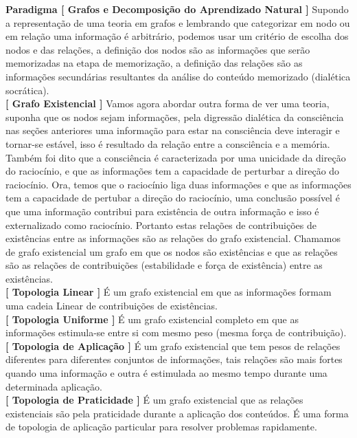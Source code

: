 \textbf{Paradigma [ Grafos e Decomposição do Aprendizado Natural ]} Supondo a representação de uma teoria em grafos e lembrando que categorizar em nodo ou em relação uma informação é arbitrário, podemos usar um critério de escolha dos nodos e das relações, a definição dos nodos são as informações que serão memorizadas na etapa de memorização, a definição das relações são as informações secundárias resultantes da análise do conteúdo memorizado (dialética socrática).\\

\textbf{[ Grafo Existencial ]} Vamos agora abordar outra forma de ver uma teoria, suponha que os nodos sejam informações, pela digressão dialética da consciência nas seções anteriores uma informação para estar na consciência deve interagir e tornar-se estável, isso é resultado da relação entre a consciência e a memória. Também foi dito que a consciência é caracterizada por uma unicidade da direção do raciocínio, e que as informações tem a capacidade de perturbar a direção do raciocínio. Ora, temos que o raciocínio liga duas informações e que as informações tem a capacidade de pertubar a direção do raciocínio, uma conclusão possível é que uma informação contribui para existência de outra informação e isso é externalizado como raciocínio. Portanto estas relações de contribuições de existências entre as informações são as relações do grafo existencial. Chamamos de grafo existencial um grafo em que os nodos são existências e que as relações são as relações de contribuições (estabilidade e força de existência) entre as existências.\\

\textbf{[ Topologia Linear ]} É um grafo existencial em que as informações formam uma cadeia Linear de contribuições de existências.\\

\textbf{[ Topologia Uniforme ]} É um grafo existencial completo em que as informações estimula-se entre si com mesmo peso (mesma força de contribuição).\\

\textbf{[ Topologia de Aplicação ]} É um grafo existencial que tem pesos de relações diferentes para diferentes conjuntos de informações, tais relações são mais fortes quando uma informação e outra é estimulada ao mesmo tempo durante uma determinada aplicação. \\

\textbf{[ Topologia de Praticidade ]} É um grafo existencial que as relações existenciais são pela praticidade durante a aplicação dos conteúdos. É uma forma de topologia de aplicação particular para resolver problemas rapidamente.\\

